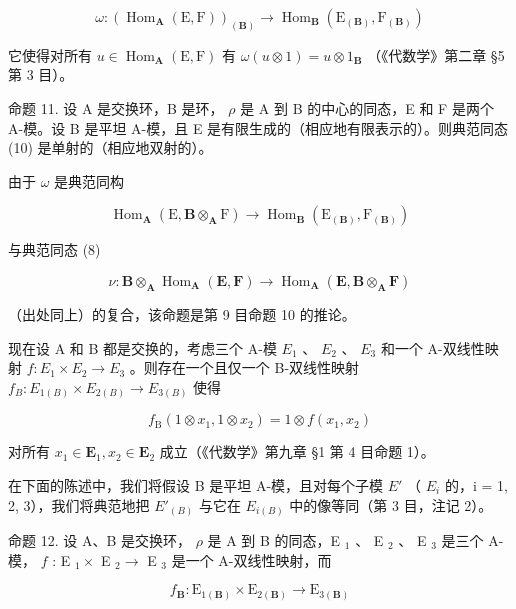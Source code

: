 \[
\omega : \left(\operatorname{Hom} _ {\mathbf {A}} (\mathrm{E}, \mathrm{F})\right) _ {(\mathbf {B})} \rightarrow \operatorname{Hom} _ {\mathbf {B}} \left(\mathrm{E} _ {(\mathbf {B})}, \mathrm{F} _ {(\mathbf {B})}\right)\tag{10}
\]

它使得对所有 \(u \in \operatorname{Hom}_{\mathbf{A}}(\mathrm{E}, \mathrm{F})\) 有 \(\omega(u \otimes 1) = u \otimes 1_{\mathbf{B}}\) （《代数学》第二章 §5 第 3 目）。

命题 11. 设 A 是交换环，B 是环， \(\rho\) 是 A 到 B 的中心的同态，E 和 F 是两个 A-模。设 B 是平坦 A-模，且 E 是有限生成的（相应地有限表示的）。则典范同态 (10) 是单射的（相应地双射的）。

由于 \(\omega\) 是典范同构

\[
\operatorname{Hom} _ {\mathbf {A}} (\mathrm{E}, \mathbf {B} \otimes_ {\mathbf {A}} \mathrm{F}) \rightarrow \operatorname{Hom} _ {\mathbf {B}} (\mathrm{E} _ {(\mathbf {B})}, \mathrm{F} _ {(\mathbf {B})})
\]

与典范同态 (8)

\[
\nu \colon \mathbf {B} \otimes_ {\mathbf {A}} \operatorname{Hom} _ {\mathbf {A}} (\mathbf {E}, \mathbf {F}) \rightarrow \operatorname{Hom} _ {\mathbf {A}} (\mathbf {E}, \mathbf {B} \otimes_ {\mathbf {A}} \mathbf {F})
\]

（出处同上）的复合，该命题是第 9 目命题 10 的推论。

现在设 A 和 B 都是交换的，考虑三个 A-模 \(E_{1}\) 、 \(E_{2}\) 、 \(E_{3}\) 和一个 A-双线性映射 \(f: E_{1} \times E_{2} \to E_{3}\) 。则存在一个且仅一个 B-双线性映射 \(f_{B}: E_{1(B)} \times E_{2(B)} \to E_{3(B)}\) 使得

\[
f _ {\mathrm{B}} (1 \otimes x _ {1}, 1 \otimes x _ {2}) = 1 \otimes f (x _ {1}, x _ {2})
\]

对所有 \(x_{1} \in \mathbf{E}_{1}, x_{2} \in \mathbf{E}_{2}\) 成立（《代数学》第九章 §1 第 4 目命题 1）。

在下面的陈述中，我们将假设 B 是平坦 A-模，且对每个子模 \(E'\) （ \(E_{i}\) 的，i = 1, 2, 3），我们将典范地把 \(E'_{(B)}\) 与它在 \(E_{i(B)}\) 中的像等同（第 3 目，注记 2）。

命题 12. 设 A、B 是交换环， \(\rho\) 是 A 到 B 的同态，E \(_{1}\) 、 E \(_{2}\) 、 E \(_{3}\) 是三个 A-模， \(f\) : E \(_{1} \times\) E \(_{2} \to\) E \(_{3}\) 是一个 A-双线性映射，而

\[
f _ {\mathbf {B}} \colon \mathrm{E} _ {1 (\mathbf {B})} \times \mathrm{E} _ {2 (\mathbf {B})} \rightarrow \mathrm{E} _ {3 (\mathbf {B})}
\]

